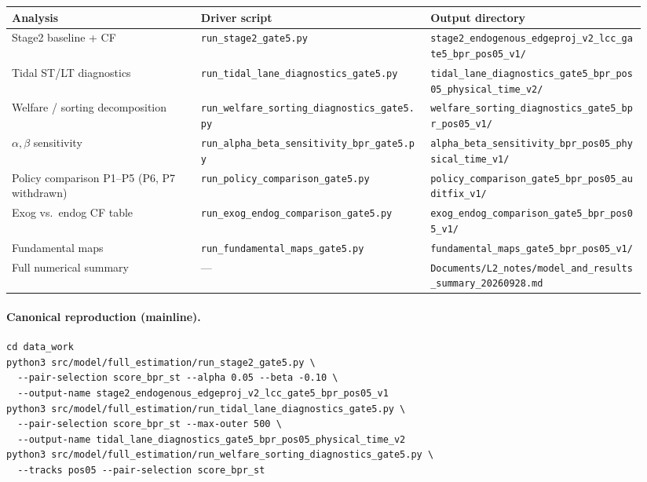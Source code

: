 \documentclass[11pt]{article}
\begin{document}
\begin{longtable}{@{}p{0.28\linewidth}p{0.34\linewidth}p{0.32\linewidth}@{}}
\toprule
\textbf{Analysis} & \textbf{Driver script} & \textbf{Output directory} \\
\midrule
\endhead
Stage2 baseline + CF &
  \texttt{run\_stage2\_gate5.py} &
  \texttt{stage2\_endogenous\_edgeproj\_v2\_lcc\_gate5\_bpr\_pos05\_v1/} \\
Tidal ST/LT diagnostics &
  \texttt{run\_tidal\_lane\_diagnostics\_gate5.py} &
  \texttt{tidal\_lane\_diagnostics\_gate5\_bpr\_pos05\_physical\_time\_v2/} \\
Welfare / sorting decomposition &
  \texttt{run\_welfare\_sorting\_diagnostics\_gate5.py} &
  \texttt{welfare\_sorting\_diagnostics\_gate5\_bpr\_pos05\_v1/} \\
$\alpha,\beta$ sensitivity &
  \texttt{run\_alpha\_beta\_sensitivity\_bpr\_gate5.py} &
  \texttt{alpha\_beta\_sensitivity\_bpr\_pos05\_physical\_time\_v1/} \\
Policy comparison P1--P5 (P6, P7 withdrawn) &
  \texttt{run\_policy\_comparison\_gate5.py} &
  \texttt{policy\_comparison\_gate5\_bpr\_pos05\_auditfix\_v1/} \\
Exog vs.\ endog CF table &
  \texttt{run\_exog\_endog\_comparison\_gate5.py} &
  \texttt{exog\_endog\_comparison\_gate5\_bpr\_pos05\_v1/} \\
Fundamental maps &
  \texttt{run\_fundamental\_maps\_gate5.py} &
  \texttt{fundamental\_maps\_gate5\_bpr\_pos05\_v1/} \\
Full numerical summary &
  --- &
  \texttt{Documents/L2\_notes/model\_and\_results\_summary\_20260928.md} \\
\bottomrule
\end{longtable}

\paragraph{Canonical reproduction (mainline).}
\begin{verbatim}
cd data_work
python3 src/model/full_estimation/run_stage2_gate5.py \
  --pair-selection score_bpr_st --alpha 0.05 --beta -0.10 \
  --output-name stage2_endogenous_edgeproj_v2_lcc_gate5_bpr_pos05_v1
python3 src/model/full_estimation/run_tidal_lane_diagnostics_gate5.py \
  --pair-selection score_bpr_st --max-outer 500 \
  --output-name tidal_lane_diagnostics_gate5_bpr_pos05_physical_time_v2
python3 src/model/full_estimation/run_welfare_sorting_diagnostics_gate5.py \
  --tracks pos05 --pair-selection score_bpr_st
\end{verbatim}
\end{document}
